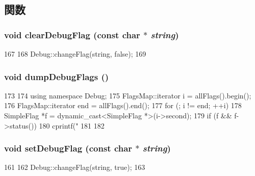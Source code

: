 \subsection{関数}
\hypertarget{base_2debug_8hh_aecb36a775ee01ef097d7e23111a27852}{
\subsubsection[{clearDebugFlag}]{\setlength{\rightskip}{0pt plus 5cm}void clearDebugFlag (const char $\ast$ {\em string})}}
\label{base_2debug_8hh_aecb36a775ee01ef097d7e23111a27852}



\begin{DoxyCode}
167 {
168     Debug::changeFlag(string, false);
169 }
\end{DoxyCode}
\hypertarget{base_2debug_8hh_a7ff54327ec09fb36dac3f025eb37af0a}{
\subsubsection[{dumpDebugFlags}]{\setlength{\rightskip}{0pt plus 5cm}void dumpDebugFlags ()}}
\label{base_2debug_8hh_a7ff54327ec09fb36dac3f025eb37af0a}



\begin{DoxyCode}
173 {
174     using namespace Debug;
175     FlagsMap::iterator i = allFlags().begin();
176     FlagsMap::iterator end = allFlags().end();
177     for (; i != end; ++i) {
178         SimpleFlag *f = dynamic_cast<SimpleFlag *>(i->second);
179         if (f && f->status())
180             cprintf("%
181     }
182 }
\end{DoxyCode}
\hypertarget{base_2debug_8hh_aeb703e006fe182d90424fcd595b68570}{
\subsubsection[{setDebugFlag}]{\setlength{\rightskip}{0pt plus 5cm}void setDebugFlag (const char $\ast$ {\em string})}}
\label{base_2debug_8hh_aeb703e006fe182d90424fcd595b68570}



\begin{DoxyCode}
161 {
162     Debug::changeFlag(string, true);
163 }
\end{DoxyCode}
